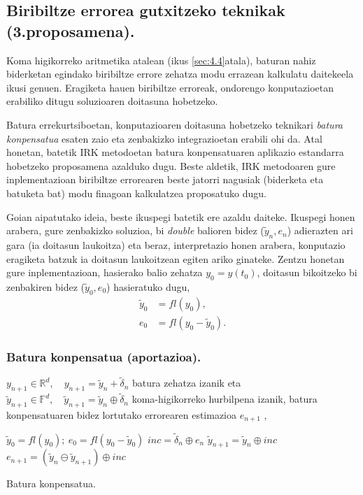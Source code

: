 \subsection{Biribiltze errorea gutxitzeko teknikak (3.proposamena).}

Koma higikorreko aritmetika atalean (ikus \ref{sec:4.4}atala), baturan nahiz biderketan egindako biribiltze errore zehatza modu errazean kalkulatu daitekeela  ikusi genuen. Eragiketa hauen biribiltze erroreak, ondorengo konputazioetan erabiliko ditugu soluzioaren doitasuna hobetzeko.

Batura errekurtsiboetan, konputazioaren doitasuna hobetzeko teknikari \emph{batura konpensatua} esaten zaio eta zenbakizko integrazioetan erabili ohi da. Atal honetan, batetik IRK metodoetan batura konpensatuaren aplikazio estandarra hobetzeko proposamena azalduko dugu. Beste aldetik, IRK metodoaren gure  inplementazioan biribiltze errorearen beste jatorri nagusiak (biderketa eta batuketa bat) modu finagoan kalkulatzea proposatuko dugu.    

Goian aipatutako ideia,  beste ikuspegi batetik ere azaldu daiteke. Ikuspegi honen arabera, gure zenbakizko soluzioa, bi \emph{double} balioren bidez ($\tilde{y}_n,e_n$)  adierazten ari gara (ia doitasun laukoitza) eta beraz, interpretazio honen arabera, konputazio eragiketa batzuk ia doitasun laukoitzean egiten ariko ginateke. Zentzu honetan gure inplementazioan, hasierako balio zehatza $y_0=y(t_0)$, doitasun bikoitzeko bi zenbakiren bidez ($\tilde{y}_0, e_0$) hasieratuko dugu,
\begin{align*}
\tilde{y}_0 &=fl(y_0) ,\\
e_0 &=fl(y_0-\tilde{y}_0).
\end{align*}


\subsubsection*{Batura konpensatua (aportazioa).}

$y_{n+1} \in \mathbb{R}^{d},\quad y_{n+1}=\tilde y_{n}+\tilde \delta_n$ batura zehatza izanik eta $\tilde y_{n+1} \in \mathbb{F}^{d}, \quad \tilde y_{n+1}=\tilde y_{n} \oplus \tilde \delta_n$ koma-higikorreko hurbilpena izanik, batura konpensatuaren bidez lortutako errorearen estimazioa $e_{n+1}$ ,

\begin{algorithm}[H]
 \BlankLine
  $\tilde{y}_{0}=fl(y_{0}); \ e_0=fl(y_0-\tilde{y}_0)$\;
 \BlankLine
  {
   \BlankLine
    $inc=\tilde {\delta}_n \oplus e_n$\;
    $\tilde {y}_{n+1}=\tilde{y}_n \oplus inc$\;
    $e_{n+1}=(\tilde{y}_n \ominus \tilde {y}_{n+1}) \oplus inc$\;
   \BlankLine
  }
 \caption{Batura konpensatua.}
\end{algorithm}

